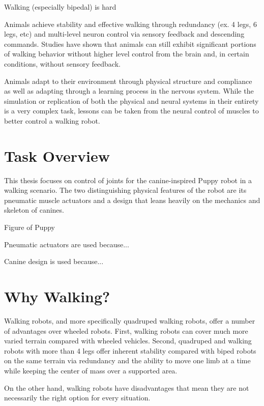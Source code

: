 Walking (especially bipedal) is hard

Animals achieve stability and effective walking through redundancy (ex. 4 legs,
6 legs, etc) and multi-level neuron control via sensory feedback and descending
commands. Studies have shown that animals can still exhibit significant portions
of walking behavior without higher level control from the brain and, in certain
conditions, without sensory feedback.

Animals adapt to their environment through physical structure and compliance as
well as adapting through a learning process in the nervous system. While the
simulation or replication of both the physical and neural systems in their
entirety is a very complex task, lessons can be taken from the neural control of
muscles to better control a walking robot.

\section{Task Overview}

This thesis focuses on control of joints for the canine-inspired
Puppy robot in a walking scenario. The two distinguishing physical features of 
the robot are its pneumatic muscle actuators and a design that leans heavily
on the mechanics and skeleton of canines.

Figure of Puppy

Pneumatic actuators are used because...

Canine design is used because...

\section{Why Walking?}

Walking robots, and more specifically quadruped walking robots, offer a number 
of advantages over wheeled robots. First, walking robots can cover much more 
varied terrain compared with wheeled vehicles. Second, quadruped and walking
robots with more than 4 legs offer inherent stability compared with biped robots
on the same terrain via redundancy and the ability to move one limb at a time
while keeping the center of mass over a supported area.


On the other hand, walking robots have disadvantages that mean they are not
necessarily the right option for every situation.

